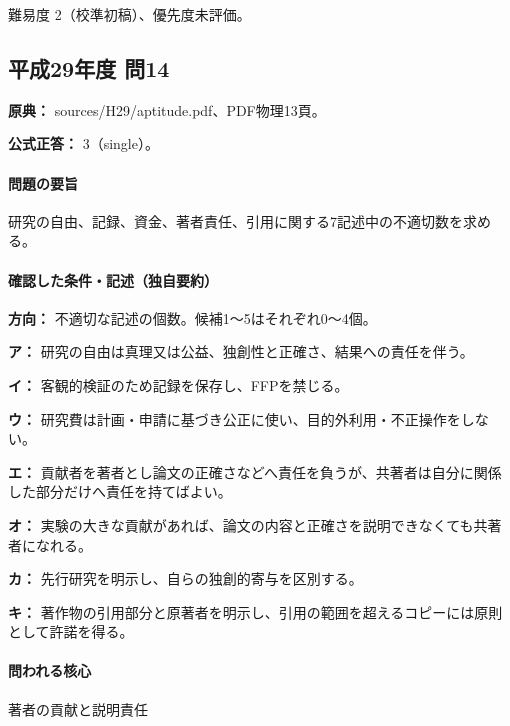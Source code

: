 \par 難易度 2（校準初稿）、優先度未評価。

\subsection{平成29年度 問14}
\label{q:h29-reg-apt-14}

\noindent\textbf{原典：} sources/H29/aptitude.pdf、PDF物理13頁。

\textbf{公式正答：} 3（single）。

\paragraph{問題の要旨} 研究の自由、記録、資金、著者責任、引用に関する7記述中の不適切数を求める。

\paragraph{確認した条件・記述（独自要約）}\mbox{}\par

\noindent\textbf{方向：} 不適切な記述の個数。候補1〜5はそれぞれ0〜4個。\par

\noindent\textbf{ア：} 研究の自由は真理又は公益、独創性と正確さ、結果への責任を伴う。\par

\noindent\textbf{イ：} 客観的検証のため記録を保存し、FFPを禁じる。\par

\noindent\textbf{ウ：} 研究費は計画・申請に基づき公正に使い、目的外利用・不正操作をしない。\par

\noindent\textbf{エ：} 貢献者を著者とし論文の正確さなどへ責任を負うが、共著者は自分に関係した部分だけへ責任を持てばよい。\par

\noindent\textbf{オ：} 実験の大きな貢献があれば、論文の内容と正確さを説明できなくても共著者になれる。\par

\noindent\textbf{カ：} 先行研究を明示し、自らの独創的寄与を区別する。\par

\noindent\textbf{キ：} 著作物の引用部分と原著者を明示し、引用の範囲を超えるコピーには原則として許諾を得る。\par

\paragraph{問われる核心} 著者の貢献と説明責任

